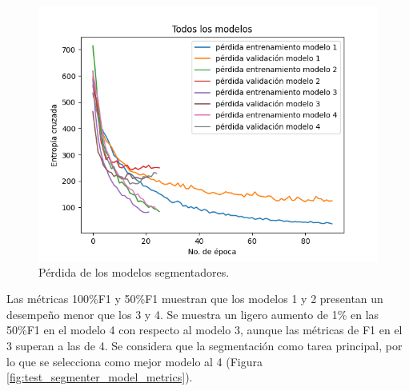 \begin{figure}[h!]
	\begin{center}
		\begin{center}
			\includegraphics[scale=.7]{Graphics/persuasive_essays_all_linked_crf_loss.png}
        \end{center}
	    \caption{Pérdida de los modelos segmentadores.}\label{fig:segmenter_model_loss}
	\end{center}
\end{figure}

Las métricas 100\%F1 y 50\%F1 muestran que los modelos 1 y 2 presentan un desempeño menor que los 3 y 4. 
Se muestra un ligero aumento de 1\% en las 50\%F1 en el modelo 4 con respecto 
al modelo 3, aunque las métricas de F1 en el 3 superan a las de 4. Se considera que la 
segmentación como tarea principal, por lo que se selecciona como mejor modelo al 4 (Figura \ref{fig:test_segmenter_model_metrics}).

